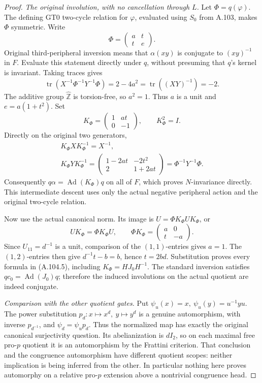 \begin{proof}
\emph{The original involution, with no cancellation through \(L\).}
Let
\(\Phi=q(\varphi)\).
The defining GT0 two-cycle relation for \(\varphi\), evaluated
using \(S_0\) from A.103, makes \(\Phi\) symmetric. Write
\[
 \Phi=\begin{pmatrix}a&t\\t&e\end{pmatrix}.
 \tag{A.104.10}
\]
Original third-peripheral inversion means that \(\alpha(xy)\)
is conjugate to \((xy)^{-1}\) in \(F\).
Evaluate this statement directly under \(q\), without presuming
that \(q\)'s kernel is invariant. Taking traces gives
\[
 \operatorname{tr}(X^{-1}\Phi^{-1}Y^{-1}\Phi)
      =2-4a^2
      =\operatorname{tr}((XY)^{-1})=-2.
 \tag{A.104.11}
\]
The additive group \(\widehat{\mathbb Z}\) is torsion-free, so
\(a^2=1\). Thus \(a\) is a unit and
\(e=a(1+t^2)\).
Set
\[
 K_\Phi=\begin{pmatrix}1&at\\0&-1\end{pmatrix},
 \qquad K_\Phi^2=I.
 \tag{A.104.12}
\]
Directly on the original two generators,
\[
 \begin{gathered}
 K_\Phi X K_\Phi^{-1}=X^{-1},\\
 K_\Phi Y K_\Phi^{-1}
   =\begin{pmatrix}1-2at&-2t^2\\2&1+2at\end{pmatrix}
   =\Phi^{-1}Y^{-1}\Phi.
 \end{gathered}
 \tag{A.104.13}
\]
Consequently \(q\alpha=\operatorname{Ad}(K_\Phi)q\) on all
of \(F\), which proves \(N\)-invariance directly.
This intermediate descent uses only the actual negative
peripheral action and the original two-cycle relation.

Now use the actual canonical norm.
Its image is \(U=\Phi K_\Phi U K_\Phi\), or
\[
 UK_\Phi=\Phi K_\Phi U,\qquad
 \Phi K_\Phi=\begin{pmatrix}a&0\\t&-a\end{pmatrix}.
 \tag{A.104.14}
\]
Since \(U_{11}=d^{-1}\) is a unit, comparison of the
\((1,1)\)-entries gives \(a=1\).
The \((1,2)\)-entries then give
\(d^{-1}t-b=b\), hence \(t=2bd\).
Substitution proves every formula in (A.104.5), including
\(K_\Phi=HJ_0H^{-1}\).
The standard inversion satisfies
\(qc_0=\operatorname{Ad}(J_0)q\); therefore the induced
involutions on the actual quotient are indeed conjugate.

\emph{Comparison with the other quotient gates.}
Put \(\psi_u(x)=x,\ \psi_u(y)=u^{-1}yu\).
The power substitution \(p_d:x\mapsto x^d,\ y\mapsto y^d\)
is a genuine automorphism, with inverse \(p_{d^{-1}}\), and
\(\psi_d=\psi_u p_d\).
Thus the normalized map has exactly the original canonical
surjectivity question.
Its abelianization is \(dI_2\), so on each maximal free pro-\(p\)
quotient it is an automorphism by the Frattini criterion.
That conclusion and the congruence automorphism have different
quotient scopes: neither implication is being inferred from the
other. In particular nothing here proves automorphy on a relative
pro-\(p\) extension above a nontrivial congruence head.


\end{proof}
